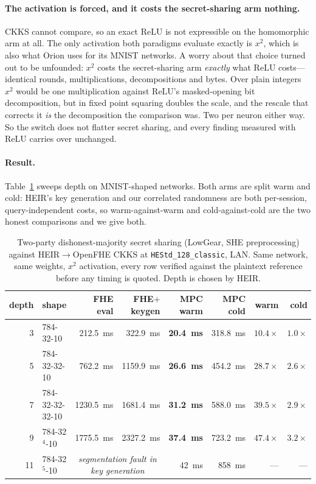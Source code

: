 \documentclass[11pt]{article}
\newcommand{\ReLU}{\ensuremath{\mathrm{ReLU}}}
\begin{document}
\paragraph{The activation is forced, and it costs the secret-sharing arm nothing.}
CKKS cannot compare, so an exact \ReLU{} is not expressible on the homomorphic
arm at all. The only activation both paradigms evaluate exactly is $x^2$, which is
also what Orion uses for its MNIST networks. A worry about that choice turned out
to be unfounded: $x^2$ costs the secret-sharing arm \emph{exactly} what \ReLU{}
costs---identical rounds, multiplications, decompositions and bytes. Over plain
integers $x^2$ would be one multiplication against \ReLU{}'s masked-opening bit
decomposition, but in fixed point squaring doubles the scale, and the rescale that
corrects it \emph{is} the decomposition the comparison was. Two per neuron either
way. So the switch does not flatter secret sharing, and every finding measured
with \ReLU{} carries over unchanged.

\paragraph{Result.} Table~\ref{tab:matched} sweeps depth on MNIST-shaped networks.
Both arms are split warm and cold: HEIR's key generation and our correlated
randomness are both per-session, query-independent costs, so warm-against-warm and
cold-against-cold are the two honest comparisons and we give both.

\begin{table}[t]
\centering
\small
\begin{tabular}{@{}rlrrrrrr@{}}
\toprule
depth & shape & FHE eval & FHE${+}$keygen & MPC warm & MPC cold & warm & cold \\
\midrule
3 & 784-32-10       & \SI{212.5}{\milli\second}  & \SI{322.9}{\milli\second}  & \textbf{\SI{20.4}{\milli\second}} & \SI{318.8}{\milli\second} & $10.4\times$ & $1.0\times$ \\
5 & 784-32-32-10    & \SI{762.2}{\milli\second}  & \SI{1159.9}{\milli\second} & \textbf{\SI{26.6}{\milli\second}} & \SI{454.2}{\milli\second} & $28.7\times$ & $2.6\times$ \\
7 & 784-32-32-32-10 & \SI{1230.5}{\milli\second} & \SI{1681.4}{\milli\second} & \textbf{\SI{31.2}{\milli\second}} & \SI{588.0}{\milli\second} & $39.5\times$ & $2.9\times$ \\
9 & 784-32$^4$-10   & \SI{1775.5}{\milli\second} & \SI{2327.2}{\milli\second} & \textbf{\SI{37.4}{\milli\second}} & \SI{723.2}{\milli\second} & $47.4\times$ & $3.2\times$ \\
11 & 784-32$^5$-10  & \multicolumn{2}{c}{\emph{segmentation fault in key generation}} & \SI{42}{\milli\second} & \SI{858}{\milli\second} & --- & --- \\
\bottomrule
\end{tabular}
\caption{Two-party dishonest-majority secret sharing (LowGear, SHE preprocessing)
against HEIR${\to}$OpenFHE CKKS at \texttt{HEStd\_128\_classic}, LAN. Same
network, same weights, $x^2$ activation, every row verified against the plaintext
reference before any timing is quoted. Depth is chosen by HEIR.}
\label{tab:matched}
\end{table}
\end{document}
